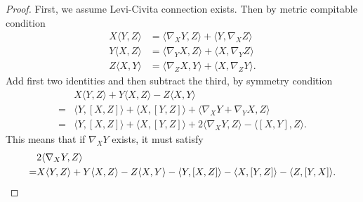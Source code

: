 \begin{proof}
  First, we assume Levi-Civita connection exists. Then by metric compitable condition 
  \begin{align*}
    X\langle Y,Z\rangle & = \langle \nabla _XY,Z\rangle+\langle Y,\nabla _XZ\rangle\\
    Y\langle X,Z\rangle & = \langle \nabla _Y X,Z\rangle + \langle X,\nabla _Y Z\rangle\\
    Z\langle X,Y\rangle & = \langle \nabla _Z X, Y\rangle + \langle X,\nabla _ZY\rangle
  .\end{align*}
  Add first two identities and then subtract the third, by symmetry condition
  \begin{align*}
    & X\langle Y, Z\rangle +Y\langle X,Z\rangle -Z\langle X,Y\rangle\\
    =& \langle Y, [X,Z]\rangle +\langle X,[Y,Z]\rangle +\langle \nabla _XY+\nabla _YX,Z\rangle\\
    =& \langle Y,[X,Z]\rangle +\langle X,[Y,Z]\rangle +2\langle \nabla _XY,Z\rangle -\langle [X,Y],Z\rangle. 
  \end{align*}
  This means that if $\nabla _X Y$ exists, it must satisfy
  \begin{align}
   & 2 \langle \nabla _X Y,Z\rangle \notag \\
    =& X\langle Y,Z\rangle +Y\langle X,Z\rangle -Z\langle X,Y\rangle -\langle Y,[X,Z]\rangle -\langle X,[Y,Z]\rangle -\langle Z,[Y,X]\rangle.\label{connection}
  \end{align}


\end{proof}
